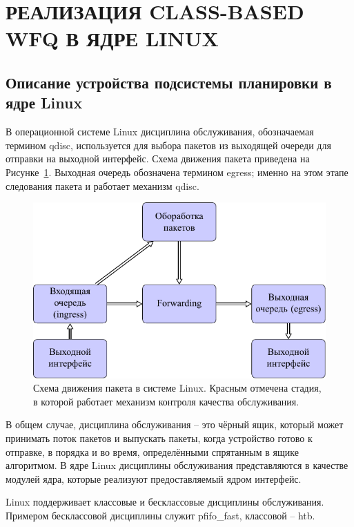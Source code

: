 \section{РЕАЛИЗАЦИЯ CLASS-BASED WFQ В ЯДРЕ LINUX}

	\subsection{Описание устройства подсистемы планировки в ядре Linux}

	В операционной системе Linux
	дисциплина обслуживания, обозначаемая термином qdisc, используется
	для выбора пакетов из выходящей очереди для отправки на выходной интерфейс.
	Схема движения пакета приведена на Рисунке~\ref{pic:flow}. Выходная очередь
	обозначена термином egress; именно на этом этапе следования пакета
	и работает механизм qdisc.\cite{lartc}

    \begin{figure}[ht!]
        \center
        \includegraphics[scale=1.3]{pdfimages/qdisc.pdf}
        \caption{Схема движения пакета в системе Linux\cite{tcpip}. Красным отмечена стадия, в которой
				 работает механизм контроля качества обслуживания.}
		\label{pic:flow}
    \end{figure}

	В общем случае, дисциплина обслуживания -- это чёрный ящик, который может
	принимать поток пакетов и выпускать пакеты,
	когда устройство
	готово к отправке, в порядка и во время, определёнными спрятанным в ящике
	алгоритмом. В ядре Linux дисциплины обслуживания представляются в качестве
	модулей ядра, которые реализуют предоставляемый ядром интерфейс.

	Linux поддерживает классовые и бесклассовые дисциплины обслуживания. Примером
	бесклассовой дисциплины служит pfifo\_fast, классовой -- htb.\cite{lartc}

